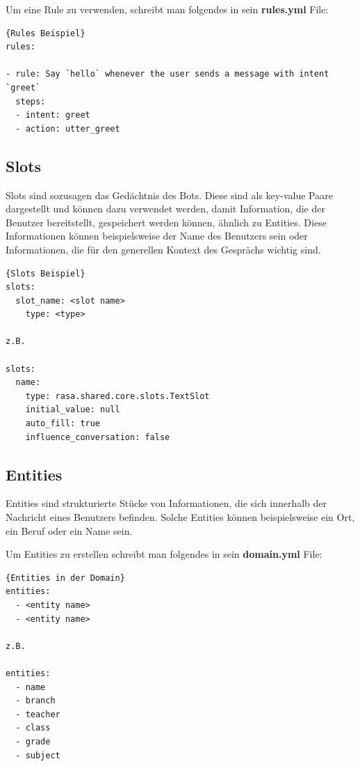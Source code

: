 Um eine Rule zu verwenden, schreibt man folgendes in sein \textbf{rules.yml} File:

\begin{lstlisting}[label={lst:rules-example},caption={Rules Beispiel}]{Rules Beispiel}
rules:

- rule: Say `hello` whenever the user sends a message with intent `greet`
  steps:
  - intent: greet
  - action: utter_greet
\end{lstlisting}

\subsection{Slots}

Slots sind sozusagen das Gedächtnis des Bots.
Diese sind als key-value Paare dargestellt und können dazu verwendet werden, damit Information, die der Benutzer bereitstellt, gespeichert werden können, ähnlich zu Entities.
Diese Informationen können beispielsweise der Name des Benutzers sein oder Informationen, die für den generellen Kontext des Gesprächs wichtig sind.\cite{slots}

\begin{lstlisting}[label={lst:slots-example},caption={Slots Beispiel}]{Slots Beispiel}
slots:
  slot_name: <slot name>
    type: <type>

z.B.

slots:
  name:
    type: rasa.shared.core.slots.TextSlot
    initial_value: null
    auto_fill: true
    influence_conversation: false
\end{lstlisting}

\subsection{Entities}

Entities sind strukturierte Stücke von Informationen, die sich innerhalb der Nachricht eines Benutzers befinden.
Solche Entities können beispielsweise ein Ort, ein Beruf oder ein Name sein.\cite{entities}

Um Entities zu erstellen schreibt man folgendes in sein \textbf{domain.yml} File:

\begin{lstlisting}[label={lst:entities-domain-example},caption={Entities in der Domain}]{Entities in der Domain}
entities:
  - <entity name>
  - <entity name>

z.B.

entities:
  - name
  - branch
  - teacher
  - class
  - grade
  - subject
\end{lstlisting}

